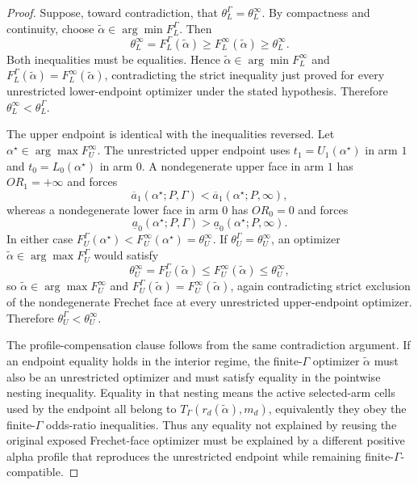 \begin{proof}
Suppose, toward contradiction, that \(\theta_L^\Gamma=\theta_L^\infty\).  By compactness and continuity, choose \(\tilde\alpha\in\arg\min F_L^\Gamma\).  Then
\[
  \theta_L^\infty
  =
  F_L^\Gamma(\tilde\alpha)
  \ge
  F_L^\infty(\tilde\alpha)
  \ge
  \theta_L^\infty.
\]
Both inequalities must be equalities.  Hence \(\tilde\alpha\in\arg\min F_L^\infty\) and \(F_L^\Gamma(\tilde\alpha)=F_L^\infty(\tilde\alpha)\), contradicting the strict inequality just proved for every unrestricted lower-endpoint optimizer under the stated hypothesis.  Therefore \(\theta_L^\infty<\theta_L^\Gamma\).

The upper endpoint is identical with the inequalities reversed.  Let \(\alpha^\star\in\arg\max F_U^\infty\).  The unrestricted upper endpoint uses \(t_1=U_1(\alpha^\star)\) in arm \(1\) and \(t_0=L_0(\alpha^\star)\) in arm \(0\).  A nondegenerate upper face in arm \(1\) has \(OR_1=+\infty\) and forces
\[
  \overline a_1(\alpha^\star;P,\Gamma)
  <
  \overline a_1(\alpha^\star;P,\infty),
\]
whereas a nondegenerate lower face in arm \(0\) has \(OR_0=0\) and forces
\[
  \underline a_0(\alpha^\star;P,\Gamma)
  >
  \underline a_0(\alpha^\star;P,\infty).
\]
In either case \(F_U^\Gamma(\alpha^\star)<F_U^\infty(\alpha^\star)=\theta_U^\infty\).  If \(\theta_U^\Gamma=\theta_U^\infty\), an optimizer \(\tilde\alpha\in\arg\max F_U^\Gamma\) would satisfy
\[
  \theta_U^\infty
  =
  F_U^\Gamma(\tilde\alpha)
  \le
  F_U^\infty(\tilde\alpha)
  \le
  \theta_U^\infty,
\]
so \(\tilde\alpha\in\arg\max F_U^\infty\) and \(F_U^\Gamma(\tilde\alpha)=F_U^\infty(\tilde\alpha)\), again contradicting strict exclusion of the nondegenerate Frechet face at every unrestricted upper-endpoint optimizer.  Therefore \(\theta_U^\Gamma<\theta_U^\infty\).

The profile-compensation clause follows from the same contradiction argument.  If an endpoint equality holds in the interior regime, the finite-\(\Gamma\) optimizer \(\tilde\alpha\) must also be an unrestricted optimizer and must satisfy equality in the pointwise nesting inequality.  Equality in that nesting means the active selected-arm cells used by the endpoint all belong to \(T_\Gamma(r_d(\tilde\alpha),m_d)\), equivalently they obey the finite-\(\Gamma\) odds-ratio inequalities.  Thus any equality not explained by reusing the original exposed Frechet-face optimizer must be explained by a different positive alpha profile that reproduces the unrestricted endpoint while remaining finite-\(\Gamma\)-compatible.
\end{proof}

